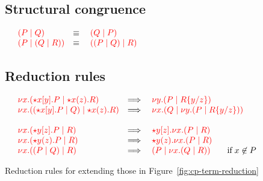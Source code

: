\begin{figure}
  \subsection*{Structural congruence}
  \(
  \begin{array}{llll}
    & \tm{\ncPool{P}{Q}}
    & \equiv \;
    & \tm{\ncPool{Q}{P}}
    \\
    & \tm{\ncPool{P}{\ncPool{Q}{R}}}
    & \equiv \;
    & \tm{\ncPool{\ncPool{P}{Q}}{R}}
  \end{array}
  \)
  
  \subsection*{Reduction rules}
  \(
  \begin{array}{llll}
    & \tm{\cpCut{x}{\ncCnt{x}{y}{P}}{\ncSrv{x}{z}{R}}}
    & \Longrightarrow \;
    & \tm{\cpCut{y}{P}{\cpSub{y}{z}{R}}}
    \\
    & \tm{\cpCut{x}{\ncPool{\ncCnt{x}{y}{P}}{Q}}{\ncSrv{x}{z}{R}}}
    & \Longrightarrow \;
    & \tm{\cpCut{x}{Q}{\cpCut{y}{P}{\cpSub{y}{z}{R}}}}
    \\
    \\
    & \tm{\cpCut{x}{\ncCnt{y}{z}{P}}{R}}
    & \Longrightarrow \;
    & \tm{\ncCnt{y}{z}{\cpCut{x}{P}{R}}}
    \\
    & \tm{\cpCut{x}{\ncSrv{y}{z}{P}}{R}}
    & \Longrightarrow \;
    & \tm{\ncSrv{y}{z}{\cpCut{x}{P}{R}}}
    \\
    & \tm{\cpCut{x}{\ncPool{P}{Q}}{R}}
    & \Longrightarrow \;
    & \tm{\ncPool{P}{\cpCut{x}{Q}{R}}} \qquad \text{if} \; x \not\in P
  \end{array}
  \)

  \begin{prooftree}
  \end{prooftree}

  \caption{Reduction rules for \nc extending those in Figure~\ref{fig:cp-term-reduction}}\label{fig:nc-term-reduction}
\end{figure}
